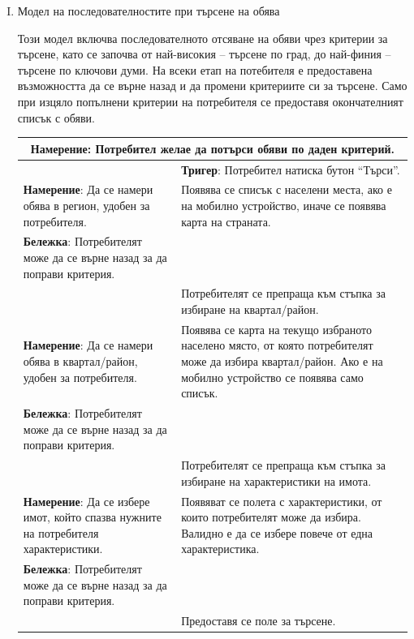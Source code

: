 \documentclass[]{article}
\begin{document}
\begin{enumerate}[I.]

	\item {Модел на последователностите при търсене на обява
	
Този модел включва последователното отсяване на обяви чрез критерии за търсене, като се започва от най-високия -- търсене по град, до най-финия -- търсене по ключови думи. На всеки етап на потебителя е предоставена възможността да се върне назад и да промени критериите си за търсене. Само при изцяло попълнени критерии на потребителя се предоставя окончателният списък с обяви.

\begin{center}
  \begin{tabular}{ |p{6cm}|p{10cm}| }
    \hline
    \multicolumn{2}{|c|}{\textbf{Намерение}: Потребител желае да потърси обяви по даден критерий.} \\    \hline
    & \textbf{Тригер}: Потребител натиска бутон ``Търси''. \\    \hline
    \textbf{Намерение}: Да се намери обява в регион, удобен за потребителя. & Появява се списък с населени места, ако е на мобилно устройство, иначе се появява карта на страната. \\    \hline
    \textbf{Бележка}: Потребителят може да се върне назад за да поправи критерия. & \\    \hline
      & Потребителят се препраща към стъпка за избиране на квартал/район. \\    \hline
    \textbf{Намерение}: Да се намери обява в квартал/район, удобен за потребителя. & Появява се карта на текущо избраното населено място, от която потребителят може да избира квартал/район. Ако е на мобилно устройство се появява само списък. \\    \hline
    \textbf{Бележка}: Потребителят може да се върне назад за да поправи критерия. & \\    \hline
     & Потребителят се препраща към стъпка за избиране на характеристики на имота. \\    \hline
    \textbf{Намерение}: Да се избере имот, който спазва нужните на потребителя характеристики. & Появяват се полета с характеристики, от които потребителят може да избира. Валидно е да се избере повече от една характеристика. \\    \hline
    \textbf{Бележка}: Потребителят може да се върне назад за да поправи критерия. & \\    \hline
     & Предоставя се поле за търсене. \\    \hline

\end{tabular}
\end{center}}
\end{enumerate}
\end{document}
